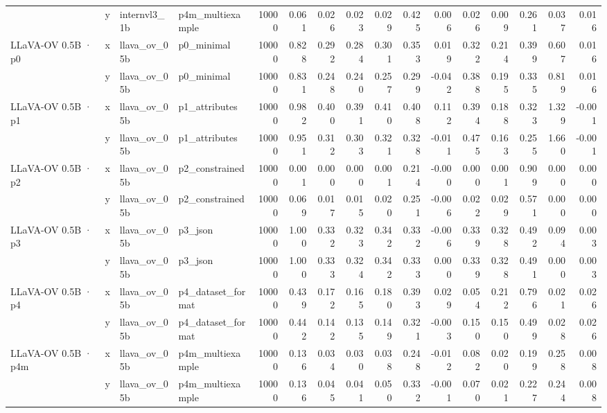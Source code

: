 \begin{tabular}{llllrrrrrrrrrrrr}
 & y & internvl3\_1b & p4m\_multiexample & 10000 & 0.061 & 0.026 & 0.023 & 0.029 & 0.425 & 0.006 & 0.026 & 0.009 & 0.261 & 0.037 & 0.016 \\
\cline{1-16}
\multirow[t]{2}{*}{LLaVA-OV 0.5B · p0} & x & llava\_ov\_05b & p0\_minimal & 10000 & 0.828 & 0.292 & 0.284 & 0.301 & 0.353 & 0.019 & 0.322 & 0.214 & 0.399 & 0.607 & 0.016 \\
 & y & llava\_ov\_05b & p0\_minimal & 10000 & 0.831 & 0.248 & 0.240 & 0.257 & 0.299 & -0.042 & 0.388 & 0.195 & 0.335 & 0.819 & 0.016 \\
\cline{1-16}
\multirow[t]{2}{*}{LLaVA-OV 0.5B · p1} & x & llava\_ov\_05b & p1\_attributes & 10000 & 0.982 & 0.400 & 0.391 & 0.410 & 0.408 & 0.112 & 0.394 & 0.188 & 0.323 & 1.329 & -0.001 \\
 & y & llava\_ov\_05b & p1\_attributes & 10000 & 0.951 & 0.312 & 0.303 & 0.321 & 0.328 & -0.011 & 0.475 & 0.163 & 0.255 & 1.660 & -0.001 \\
\cline{1-16}
\multirow[t]{2}{*}{LLaVA-OV 0.5B · p2} & x & llava\_ov\_05b & p2\_constrained & 10000 & 0.001 & 0.000 & 0.000 & 0.001 & 0.214 & -0.000 & 0.000 & 0.001 & 0.909 & 0.000 & 0.000 \\
 & y & llava\_ov\_05b & p2\_constrained & 10000 & 0.069 & 0.017 & 0.015 & 0.020 & 0.251 & -0.006 & 0.022 & 0.029 & 0.571 & 0.000 & 0.000 \\
\cline{1-16}
\multirow[t]{2}{*}{LLaVA-OV 0.5B · p3} & x & llava\_ov\_05b & p3\_json & 10000 & 1.000 & 0.332 & 0.323 & 0.342 & 0.332 & -0.006 & 0.339 & 0.328 & 0.492 & 0.094 & 0.003 \\
 & y & llava\_ov\_05b & p3\_json & 10000 & 1.000 & 0.333 & 0.324 & 0.342 & 0.333 & 0.000 & 0.339 & 0.328 & 0.491 & 0.000 & 0.003 \\
\cline{1-16}
\multirow[t]{2}{*}{LLaVA-OV 0.5B · p4} & x & llava\_ov\_05b & p4\_dataset\_format & 10000 & 0.439 & 0.172 & 0.165 & 0.180 & 0.393 & 0.029 & 0.054 & 0.212 & 0.796 & 0.021 & 0.026 \\
 & y & llava\_ov\_05b & p4\_dataset\_format & 10000 & 0.442 & 0.142 & 0.135 & 0.149 & 0.321 & -0.003 & 0.150 & 0.150 & 0.499 & 0.028 & 0.026 \\
\cline{1-16}
\multirow[t]{2}{*}{LLaVA-OV 0.5B · p4m} & x & llava\_ov\_05b & p4m\_multiexample & 10000 & 0.136 & 0.034 & 0.030 & 0.038 & 0.248 & -0.012 & 0.082 & 0.020 & 0.199 & 0.258 & 0.008 \\
 & y & llava\_ov\_05b & p4m\_multiexample & 10000 & 0.136 & 0.045 & 0.041 & 0.050 & 0.332 & -0.001 & 0.070 & 0.021 & 0.227 & 0.244 & 0.008 \\

\end{tabular}
